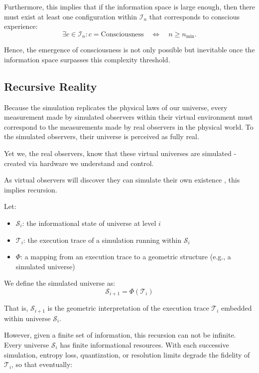 \documentclass[11pt]{article}
\begin{document}
Furthermore, this implies that if the information space is large enough, then there must exist at least one
configuration within $\mathcal{I}_n$ that corresponds to conscious experience:
\[
  \exists c \in \mathcal{I}_n : c = \text{Consciousness} \quad \iff \quad n \geq n_{\min}.
\]

Hence, the emergence of consciousness is not only possible but inevitable once the information 
space surpasses this complexity threshold.


\subsection{Recursive Reality}

Because the simulation replicates the physical laws of our universe, every measurement made by simulated observers 
within their virtual environment must correspond to the measurements made by real observers in the physical world. 
To the simulated observers, their universe is perceived as fully real.

Yet we, the real observers, know that these virtual universes are simulated - created via hardware we understand and control.

As virtual observers will discover they can simulate their own existence \cite{bostrom2003}, this implies recursion.

Let:

\begin{itemize}
  \item \( \mathcal{S}_i \): the informational state of universe at level \( i \)
  \item \( \mathcal{T}_i \): the execution trace of a simulation running within \( \mathcal{S}_i \)
  \item \( \Phi \): a mapping from an execution trace to a geometric structure (e.g., a simulated universe)
\end{itemize}

We define the simulated universe as:
\[
  \mathcal{S}_{i+1} = \Phi(\mathcal{T}_i)
\]

That is, \( \mathcal{S}_{i+1} \) is the geometric interpretation of the execution trace \( \mathcal{T}_i \) embedded within 
universe \( \mathcal{S}_i \).

However, given a finite set of information, this recursion can not be infinite. Every universe \( \mathcal{S}_i \) has finite 
informational resources. With each successive simulation, entropy loss, quantization, or resolution limits degrade the 
fidelity of \( \mathcal{T}_i \), so that eventually:
\end{document}
